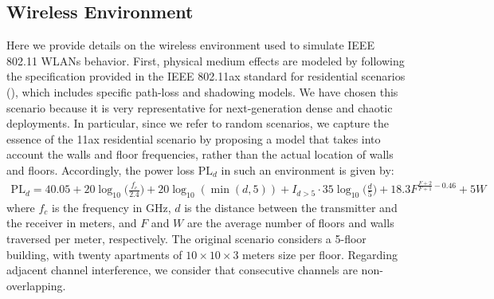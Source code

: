 \documentclass[preprint,12pt]{elsarticle}
\begin{document}
\begin{appendices}
\section{Wireless Environment}
\label{section:simulated_wireless_environment}	
Here we provide details on the wireless environment used to simulate IEEE 802.11 WLANs behavior. First, physical medium effects are modeled by following the specification provided in the IEEE 802.11ax standard for residential scenarios (\citealp{merlin2015tgax}), which includes specific path-loss and shadowing models. We have chosen this scenario because it is very representative for next-generation dense and chaotic deployments. In particular, since we refer to random scenarios, we capture the essence of the 11ax residential scenario by proposing a model that takes into account the walls and floor frequencies, rather than the actual location of walls and floors. Accordingly, the power loss $\text{PL}_d$ in such an environment is given by:
\begin{align}
	\text{PL}_d = 40.05 + 20 \log_{10}\Big(\frac{f_c}{2.4}\Big) + 20 \log_{10}(\min(d,5)) + \nonumber I_{d>5} \cdot 35\log_{10}\Big(\frac{d}{5}\Big) + 18.3 F^{\frac{F+2}{F+1}-0.46} + 5W
	\nonumber
\end{align}	
where $f_c$ is the frequency in GHz, $d$ is the distance between the transmitter and the receiver in meters, and $F$ and $W$ are the average number of floors and walls traversed per meter, respectively. The original scenario considers a 5-floor building, with twenty apartments of $10\times10\times3$ meters size per floor. Regarding adjacent channel interference, we consider that consecutive channels are non-overlapping. 


\end{appendices}
\end{document}
